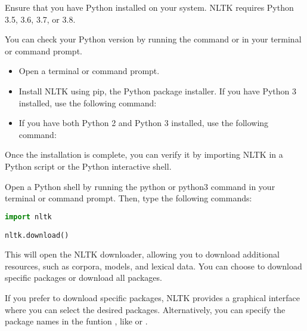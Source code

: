 Ensure that you have Python installed on your system. NLTK requires Python 3.5, 3.6, 3.7, or 3.8.  


\bigskip

You can check your Python version by running the command  or  in your terminal or command prompt. 

\bigskip

\begin{itemize}
  \item Open a terminal or command prompt. 
  \item Install NLTK using pip, the Python package installer. If you have Python 3 installed, use the following command: 
  
    \medskip
    
    
 \item If you have both Python 2 and Python 3 installed, use the following command: 

    \medskip
    

\end{itemize}

Once the installation is complete, you can verify it by importing NLTK in a Python script or the Python interactive shell. 

Open a Python shell by running the python or python3 command in your terminal or command prompt. Then, type the following commands: 

\medskip

\begin{lstlisting}[language=Python]
import nltk 

nltk.download() 
\end{lstlisting}

\medskip

This will open the NLTK downloader, allowing you to download additional resources, such as corpora, models, and lexical data. You can choose to download specific packages or download all packages. 

If you prefer to download specific packages, NLTK provides a graphical interface where you can select the desired packages. Alternatively, you can specify the package names in the funtion , like  or . 

\bigskip

